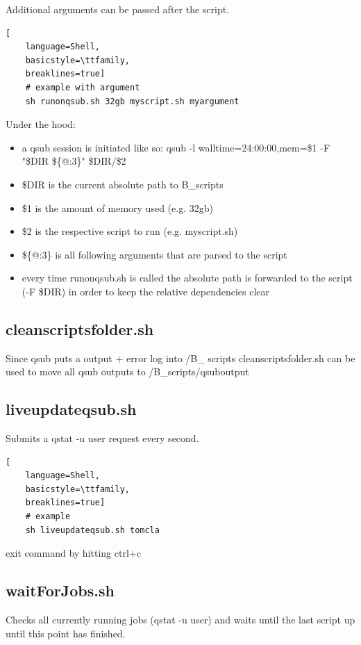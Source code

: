 \documentclass[12pt,a4paper]{scrartcl}
\begin{document}
\noindent Additional arguments can be passed after the script.\\
\begin{lstlisting}[
    language=Shell,
    basicstyle=\ttfamily,
    breaklines=true]
    # example with argument
    sh runonqsub.sh 32gb myscript.sh myargument
\end{lstlisting}
\noindent Under the hood:
\begin{itemize}
\item a qsub session is initiated like so: qsub -l walltime=24:00:00,mem=\$1 -F "\$DIR \$\{@:3\}" \$DIR/\$2
\item \$DIR is the current absolute path to B\_scripts
\item \$1 is the amount of memory used (e.g. 32gb)
\item \$2 is the respective script to run (e.g. myscript.sh)
\item \$\{@:3\} is all following arguments that are parsed to the script
\item every time runonqsub.sh is called the absolute path is forwarded to the script (-F \$DIR) in order to keep the relative dependencies clear
\end{itemize}

\subsection{cleanscriptsfolder.sh}
Since qsub puts a output + error log into /B\_ scripts cleanscriptsfolder.sh can be used to move all qsub outputs to /B\_scripts/qsuboutput\\

\subsection{liveupdateqsub.sh}
Submits a qstat -u user request every second.
\begin{lstlisting}[
    language=Shell,
    basicstyle=\ttfamily,
    breaklines=true]
    # example
    sh liveupdateqsub.sh tomcla
\end{lstlisting}

\noindent exit command by hitting ctrl+c

\subsection{waitForJobs.sh}
Checks all currently running jobs (qstat -u user) and waits until the last script up until this point has finished.
\end{document}
